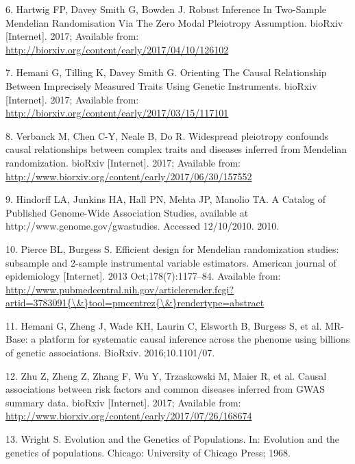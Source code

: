 \documentclass[]{article}
\begin{document}
\hypertarget{ref-Hartwig2017}{}
6. Hartwig FP, Davey Smith G, Bowden J. Robust Inference In Two-Sample
Mendelian Randomisation Via The Zero Modal Pleiotropy Assumption.
bioRxiv {[}Internet{]}. 2017; Available from:
\url{http://biorxiv.org/content/early/2017/04/10/126102}

\hypertarget{ref-Hemani2017}{}
7. Hemani G, Tilling K, Davey Smith G. Orienting The Causal Relationship
Between Imprecisely Measured Traits Using Genetic Instruments. bioRxiv
{[}Internet{]}. 2017; Available from:
\url{http://biorxiv.org/content/early/2017/03/15/117101}

\hypertarget{ref-Verbanck2017}{}
8. Verbanck M, Chen C-Y, Neale B, Do R. Widespread pleiotropy confounds
causal relationships between complex traits and diseases inferred from
Mendelian randomization. bioRxiv {[}Internet{]}. 2017; Available from:
\url{http://www.biorxiv.org/content/early/2017/06/30/157552}

\hypertarget{ref-Hindorff2010}{}
9. Hindorff LA, Junkins HA, Hall PN, Mehta JP, Manolio TA. A Catalog of
Published Genome-Wide Association Studies, available at
http://www.genome.gov/gwastudies. Accessed 12/10/2010. 2010.

\hypertarget{ref-Pierce2013}{}
10. Pierce BL, Burgess S. Efficient design for Mendelian randomization
studies: subsample and 2-sample instrumental variable estimators.
American journal of epidemiology {[}Internet{]}. 2013
Oct;178(7):1177--84. Available from:
\href{http://www.pubmedcentral.nih.gov/articlerender.fcgi?artid=3783091\%7B/\&\%7Dtool=pmcentrez\%7B/\&\%7Drendertype=abstract}{http://www.pubmedcentral.nih.gov/articlerender.fcgi?artid=3783091\{\textbackslash{}\&\}tool=pmcentrez\{\textbackslash{}\&\}rendertype=abstract}

\hypertarget{ref-Hemani2016}{}
11. Hemani G, Zheng J, Wade KH, Laurin C, Elsworth B, Burgess S, et al.
MR-Base: a platform for systematic causal inference across the phenome
using billions of genetic associations. BioRxiv. 2016;10.1101/07.

\hypertarget{ref-Zhu2017}{}
12. Zhu Z, Zheng Z, Zhang F, Wu Y, Trzaskowski M, Maier R, et al. Causal
associations between risk factors and common diseases inferred from GWAS
summary data. bioRxiv {[}Internet{]}. 2017; Available from:
\url{http://www.biorxiv.org/content/early/2017/07/26/168674}

\hypertarget{ref-Wright1968}{}
13. Wright S. Evolution and the Genetics of Populations. In: Evolution
and the genetics of populations. Chicago: University of Chicago Press;
1968.
\end{document}
